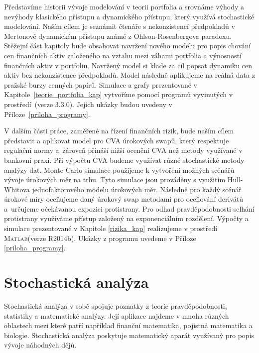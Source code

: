 \documentclass[a4paper,12pt]{report}
\makeatletter
\theoremstyle{definition} \newtheorem{definice}[veta]{Definice}
\theoremstyle{remark}
\newcommand{\MATLAB}{\textsc{Matlab}\xspace}
\def\R{\scalebox{\f@size}{\usebox\rbox}\xspace}
\makeatother
\begin{document}
Představíme historii vývoje modelování v teorii portfolia a srovnáme výhody a nevýhody klasického přístupu a dynamického přístupu, který využívá stochastické modelování.
Naším cílem je seznámit čtenáře s nekonzistencí předpokladů v Mertonově dynamickém přístupu známé z Ohlson-Rosenbergova paradoxu.
Stěžejní část kapitoly bude obsahovat navržení nového modelu pro popis chování cen finančních aktiv založeného na vztahu mezi váhami portfolia a výnosností finančních aktiv v portfoliu.
Navržený model si klade za cíl popsat dynamiku cen aktiv bez nekonzistence předpokladů.
Model následně aplikujeme na reálná data z pražské burzy cenných papírů.
Simulace a grafy prezentované v Kapitole~\ref{teorie_portfolia_kap} vytvoříme pomocí programů vyvinutých v prostředí~\R (verze 3.3.0).
Jejich ukázky budou uvedeny v Příloze~\ref{priloha_programy}.

V dalším části práce, zaměřené na  řízení finančních rizik, bude naším cílem představit a aplikovat model pro CVA úrokových swapů, který respektuje regulační normy a~zároveň přináší nižší ocenění CVA než metody využívané v bankovní praxi.
Při výpočtu CVA budeme využívat různé stochastické metody analýzy dat.
Monte Carlo simulace použijeme k vytvoření  možných scénářů vývoje úrokových měr na trhu. 
Tyto simulace jsou prováděny s využitím Hull-Whitova jednofaktorového modelu úrokových měr.
Následně pro každý scénář úrokové míry oceňujeme daný úrokový swap metodami pro oceňování derivátů a~určujeme očekávanou expozici protistrany.
Pro odhad pravděpodobnosti selhání protistrany využíváme přístup založený na exponenciálním rozdělení.
Výpočty a simulace prezentované v Kapitole \ref{rizika_kap} realizujeme v prostředí \MATLAB (verze  R2014b).
Ukázky z programu uvedeme v Příloze \ref{priloha_programy}.


\chapter{Stochastická analýza}\label{stochasticka_analyza_kap}
Stochastická analýza v sobě spojuje poznatky z teorie pravděpodobnosti, statistiky a matematické analýzy.
Její aplikace najdeme v mnoha různých oblastech mezi které patří například finanční matematika, pojistná matematika a biologie.
Stochastická analýza poskytuje matematický aparát využívaný pro popis vývoje náhodných dějů.
\end{document}
